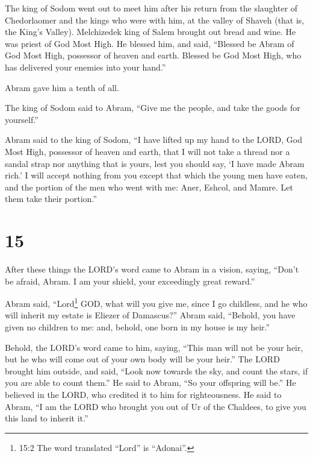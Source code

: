  The king of Sodom went out to meet him after his return
from the slaughter of Chedorlaomer and the kings who were with him, at
the valley of Shaveh (that is, the King's Valley). 
Melchizedek king of Salem brought out bread and wine. He was priest of
God Most High.  He blessed him, and said, ``Blessed be
Abram of God Most High, possessor of heaven and earth. 
Blessed be God Most High, who has delivered your enemies into your
hand.''

Abram gave him a tenth of all.

 The king of Sodom said to Abram, ``Give me the people, and
take the goods for yourself.''

 Abram said to the king of Sodom, ``I have lifted up my
hand to the LORD, God Most High, possessor of heaven and earth,
 that I will not take a thread nor a sandal strap nor
anything that is yours, lest you should say, `I have made Abram rich.'
 I will accept nothing from you except that which the young
men have eaten, and the portion of the men who went with me: Aner,
Eshcol, and Mamre. Let them take their portion.''

\hypertarget{section-14}{%
\section{15}\label{section-14}}

 After these things the LORD's word came to Abram in a
vision, saying, ``Don't be afraid, Abram. I am your shield, your
exceedingly great reward.''

 Abram said, ``Lord\footnote{15:2 The word translated
  ``Lord'' is ``Adonai''.} GOD, what will you give me, since I go
childless, and he who will inherit my estate is Eliezer of Damascus?''
 Abram said, ``Behold, you have given no children to me:
and, behold, one born in my house is my heir.''

 Behold, the LORD's word came to him, saying, ``This man
will not be your heir, but he who will come out of your own body will be
your heir.''  The LORD brought him outside, and said, ``Look
now towards the sky, and count the stars, if you are able to count
them.'' He said to Abram, ``So your offspring will be.''  He
believed in the LORD, who credited it to him for righteousness.
 He said to Abram, ``I am the LORD who brought you out of Ur
of the Chaldees, to give you this land to inherit it.''

